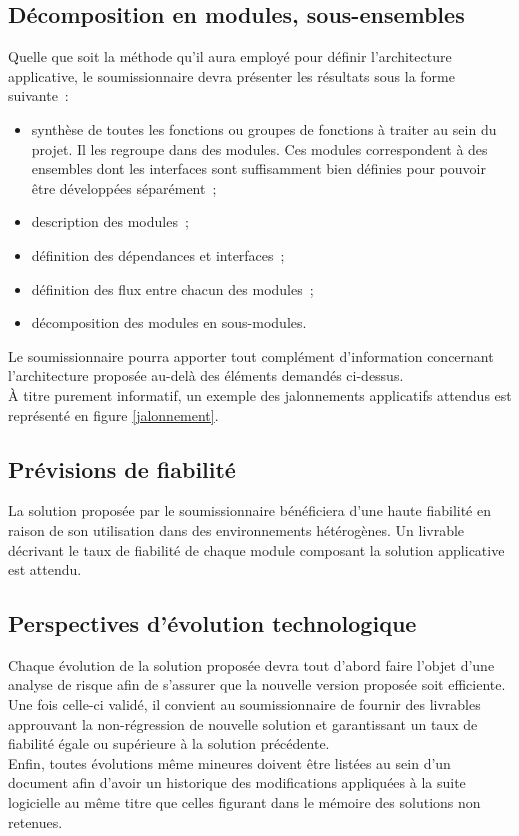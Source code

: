 \subsection{Décomposition en modules, sous-ensembles}
Quelle que soit la méthode qu'il aura employé pour définir l'architecture applicative, le soumissionnaire devra présenter les résultats sous la forme suivante~:
\begin{itemize}
	\item synthèse de toutes les fonctions ou groupes de fonctions à traiter au sein du projet. Il les regroupe dans des modules. Ces modules correspondent à des ensembles dont les interfaces sont suffisamment bien définies pour pouvoir être développées séparément~;
	\item description des modules~;
	\item définition des dépendances et interfaces~;
	\item définition des flux entre chacun des modules~;
	\item décomposition des modules en sous-modules.
\end{itemize}
Le soumissionnaire pourra apporter tout complément d'information concernant l'architecture proposée au-delà des éléments demandés ci-dessus.
\\
À titre purement informatif, un exemple des jalonnements applicatifs attendus est représenté en figure \ref{jalonnement}.

\subsection{Prévisions de fiabilité}
La solution proposée par le soumissionnaire bénéficiera d'une haute fiabilité en raison de son utilisation dans des environnements hétérogènes. Un livrable décrivant le taux de fiabilité de chaque module composant la solution applicative est attendu.

\subsection{Perspectives d'évolution technologique}
Chaque évolution de la solution proposée devra tout d'abord faire l'objet d'une analyse de risque afin de s'assurer que la nouvelle version proposée soit efficiente.
\\
Une fois celle-ci validé, il convient au soumissionnaire de fournir des livrables approuvant la non-régression de nouvelle solution et garantissant un taux de fiabilité égale ou supérieure à la solution précédente.
\\
Enfin, toutes évolutions même mineures doivent être listées au sein d'un document afin d'avoir un historique des modifications appliquées à la suite logicielle au même titre que celles figurant dans le mémoire des solutions non retenues.

